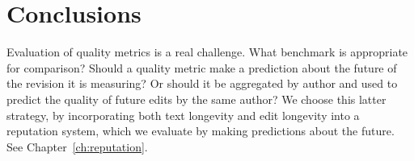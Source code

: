 \section{Conclusions}

Evaluation of quality metrics is a real challenge.
What benchmark is appropriate for comparison?
Should a quality metric make a prediction about
the future of the revision it is measuring?
Or should it be aggregated by author and used
to predict the quality of future edits by the
same author?
We choose this latter strategy, by incorporating
both text longevity and edit longevity into a reputation
system, which we evaluate by making predictions about the
future.
See Chapter~\ref{ch:reputation}.


